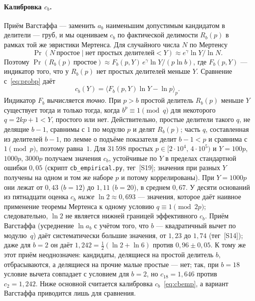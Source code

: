\documentclass[11pt,a4paper]{article}
\theoremstyle{plain}
\theoremstyle{remark}
\newcommand{\Rb}{R_b}
\newcommand{\eg}{e^{\gamma}}
\begin{document}
\paragraph{Калибровка $c_b$.} Приём Вагстаффа --- заменить $a_b$ наименьшим
допустимым кандидатом в делители --- груб, и мы оцениваем $c_b$ по фактической
делимости $\Rb(p)$ в рамках той же эвристики Мертенса. Для случайного числа $N$
по Мертенсу
\[
\Pr(N\ \text{простое}\mid\text{нет простых делителей}<Y)\approx\eg\ln Y/\ln N.
\]
Поэтому $\Pr(\Rb(p)\ \text{простое})\approx F_b(p,Y)\,\eg\ln Y/(p\ln b)$, где
$F_b(p,Y)$ --- индикатор того, что у $\Rb(p)$ нет простых делителей меньше $Y$.
Сравнение с~\eqref{eq:probp} даёт
\begin{equation}\label{eq:cbemp}
c_b(Y)=\bigl\langle F_b(p,Y)\ln Y-\ln p\bigr\rangle_p .
\end{equation}
Индикатор $F_b$ вычисляется \emph{точно}. При $p>b$ простой делитель $\Rb(p)$
меньше $Y$ существует тогда и только тогда, когда $b^p\equiv1\pmod q$ для
некоторого $q=2kp+1<Y$, простого или нет. Действительно, простые делители такого
$q$, не делящие $b-1$, сравнимы с $1$ по модулю $p$ и делят $\Rb(p)$; часть $q$,
составленная из делителей $b-1$, по лемме о подъёме показателя делит $b-1<p$ и
сравнима с $1\pmod p$, поэтому равна~$1$. Для $31\,598$ простых
$p\in[2\cdot10^4,\,4\cdot10^5)$ и $Y=100p$, $1000p$, $3000p$ получаем значения
$c_b$, устойчивые по $Y$ в пределах стандартной ошибки $0{,}05$ (скрипт
\texttt{cb\_empirical.py}, тег~[S19]; значения при разных $Y$ получены на одном и
том же наборе $p$ и потому коррелированы). При $Y=1000p$ они лежат от $0{,}43$
($b=12$) до $1{,}11$ ($b=20$), в среднем $0{,}67$. У десяти оснований из пятнадцати
оценка $c_b$ \emph{ниже} $\ln2\approx0{,}693$ --- значения, которое даёт наивное
применение теоремы Мертенса к одному условию $q\equiv1\pmod{2p}$; следовательно,
$\ln2$ не является нижней границей эффективного $c_b$. Приём Вагстаффа
(усреднение $\ln a_b$ с учётом того, что $b$ --- квадратичный вычет по
модулю~$q$) даёт систематически большие значения, от $1{,}23$ до $1{,}74$
(тег~[S14]); даже для $b=2$ он даёт $1{,}242=\tfrac12(\ln2+\ln6)$ против
$0{,}96\pm0{,}05$. К тому же этот приём неоднозначен: кандидаты, делящиеся на
простой делитель $b$, отбрасываются, а делящиеся на прочие малые простые --- нет;
так, при $b=18$ условие вычета совпадает с условием для $b=2$, но
$c_{18}=1{,}646$ против $c_2=1{,}242$. Ниже основной считается калибровка
$c_b$~\eqref{eq:cbemp}, а вариант Вагстаффа приводится лишь для сравнения.
\end{document}
